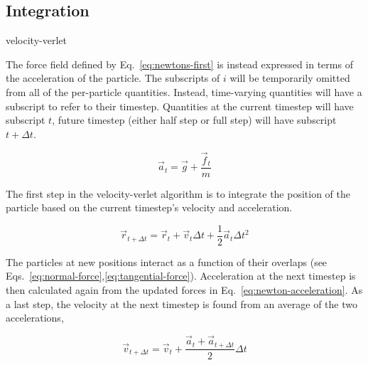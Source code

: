 \subsection{Integration}
velocity-verlet

The force field defined by Eq.~\ref{eq:newtons-first} is instead expressed in terms of the acceleration of the particle. The subscripts of $i$ will be temporarily omitted from all of the per-particle quantities. Instead, time-varying quantities will have a subscript to refer to their timestep. Quantities at the current timestep will have subscript $t$, future timestep (either half step or full step) will have subscript $t+\Delta t$.

\begin{equation}\label{eq:newton-acceleration}
	\vec{a}_t = \vec{g} + \frac{\vec{f}_t}{m}
\end{equation}

The first step in the velocity-verlet algorithm is to integrate the position of the particle based on the current timestep's velocity and acceleration.

\begin{equation}
	\vec{r}_{t+\Delta t} = \vec{r}_t + \vec{v}_t\Delta t + \frac{1}{2}\vec{a}_t\Delta t^2
\end{equation}

The particles at new positions interact as a function of their overlaps (see Eqs.~\ref{eq:normal-force},\ref{eq:tangential-force}). Acceleration at the next timestep is then calculated again from the updated forces in Eq.~\ref{eq:newton-acceleration}. As a last step, the velocity at the next timestep is found from an average of the two accelerations,

\begin{equation}
	\vec{v}_{t+\Delta t} = \vec{v}_t + \frac{\vec{a}_t + \vec{a}_{t+\Delta t}}{2}\Delta t
\end{equation}


